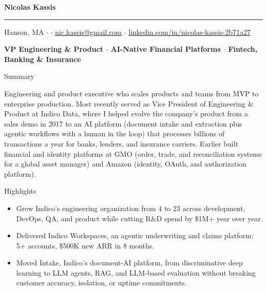 \documentclass[10pt,oneside]{article}
\makeatletter
\newcommand{\name}{Nicolas Kassis}
\newcommand{\location}{Hanson, MA}
\newcommand{\email}{nic.kassis@gmail.com}
\newcommand{\linkedinurl}{linkedin.com/in/nicolas-kassis-2b71a27}
\providecommand*{\phone}{}
\newcommand{\phoneblock}{\ifx\phone\empty\else\phone{} \; $\cdot$ \; \fi}
\newcommand{\bigname}[1]{
  \begin{center}\fontfamily{phv}\selectfont\Huge\bfseries#1\end{center}
}
\newcommand{\headline}[1]{
  \begin{center}\fontfamily{phv}\selectfont\small\bfseries#1\end{center}
}
\newenvironment{ressection}[1]{
  \vspace{4pt}
  {\fontfamily{phv}\selectfont\Large#1}
  \begin{itemize}
    \vspace{3pt}
}{
  \end{itemize}
}
\newcommand{\ressubitem}[1]{
  \vspace{-1pt}
\item \begin{flushleft} #1 \end{flushleft}
}
\makeatother
\begin{document}
\bigname{\name}
\vspace{-8pt} \rule{\textwidth}{1pt}
\vspace{2pt}
\begin{center}
  {\small \location{} \; $\cdot$ \; \phoneblock\href{mailto:\email}{\email} \; $\cdot$ \; \href{https://\linkedinurl}{\linkedinurl}}
\end{center}
\headline{VP Engineering \& Product $\cdot$ AI-Native Financial Platforms $\cdot$ Fintech, Banking \& Insurance}
\vspace{6pt}

\vspace{4pt}
{\selectfont\Large Summary}
\vspace{3pt}

\begin{flushleft}
Engineering and product executive who scales products and teams from MVP to enterprise production. Most recently served as Vice President of Engineering \& Product at Indico Data, where I helped evolve the company's product from a sales demo in 2017 to an AI platform (document intake and extraction plus agentic workflows with a human in the loop) that processes billions of transactions a year for banks, lenders, and insurance carriers. Earlier built financial and identity platforms at GMO (order, trade, and reconciliation systems for a global asset manager) and Amazon (identity, OAuth, and authorization platform).
\end{flushleft}

\begin{ressection}{Highlights}
  \ressubitem{Grew Indico's engineering organization from 4 to 23 across development, DevOps, QA, and product while cutting R\&D spend by \$1M+ year over year.}
  \ressubitem{Delivered Indico Workspaces, an agentic underwriting and claims platform: 5+ accounts, \$500K new ARR in 8 months.}
  \ressubitem{Moved Intake, Indico's document-AI platform, from discriminative deep learning to LLM agents, RAG, and LLM-based evaluation without breaking customer accuracy, isolation, or uptime commitments.}
\end{ressection}
\end{document}
